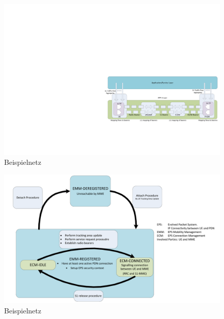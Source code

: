 \begin{figure}[htbp]
	\centering
	\includegraphics[width=1.0\textwidth]{images/3gpp/bearers.pdf}
	\caption{Beispielnetz}\label{fig:3gpp-bearers}
\end{figure}


\begin{figure}[htbp]
	\centering
	\includegraphics[width=1.0\textwidth]{images/3gpp/ECM-states.pdf}
	\caption{Beispielnetz}\label{fig:3gpp-ecmstates}
\end{figure}

